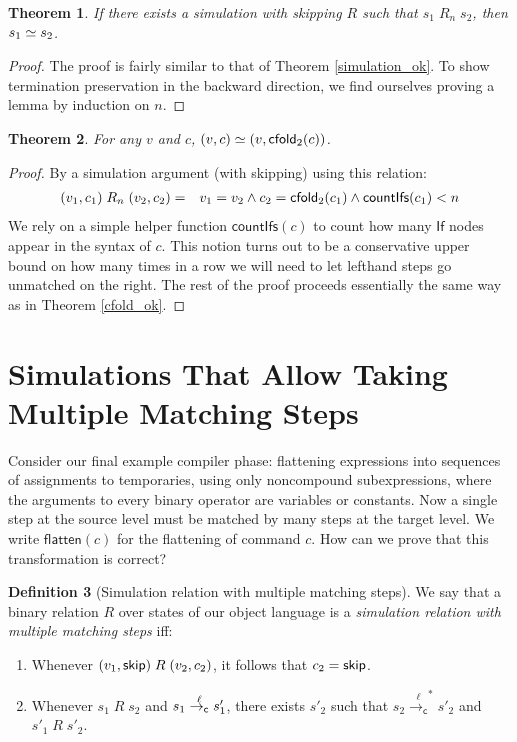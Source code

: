 \documentclass{amsbook}
\newtheorem{theorem}{Theorem}[chapter]
\theoremstyle{definition}
\newtheorem{definition}[theorem]{Definition}
\theoremstyle{remark}
\numberwithin{section}{chapter}
\numberwithin{equation}{chapter}
\begin{document}
\begin{theorem}
  If there exists a simulation with skipping $R$ such that $s_1 \; R_n \; s_2$, then $s_1 \simeq s_2$.
\end{theorem}
\begin{proof}
  The proof is fairly similar to that of Theorem \ref{simulation_ok}.
  To show termination preservation in the backward direction, we find ourselves proving a lemma by induction on $n$.
\end{proof}

\newcommand{\countIfs}[1]{\mathsf{countIfs}(#1)}

\begin{theorem}
  For any $v$ and $c$, $(v, c) \simeq (v, \mathsf{cfold}_2(c))$.
\end{theorem}
\begin{proof}
  By a simulation argument (with skipping) using this relation:
  \begin{eqnarray*}
    (v_1, c_1) \; R_n \; (v_2, c_2) &=& v_1 = v_2 \land c_2 = \cfoldt{c_1} \land \countIfs{c_1} < n
  \end{eqnarray*}
  We rely on a simple helper function $\countIfs{c}$ to count how many $\mathsf{If}$ nodes appear in the syntax of $c$.
  This notion turns out to be a conservative upper bound on how many times in a row we will need to let lefthand steps go unmatched on the right.
  The rest of the proof proceeds essentially the same way as in Theorem \ref{cfold_ok}.
\end{proof}


\section{Simulations That Allow Taking Multiple Matching Steps}

\newcommand{\flatten}[1]{\mathsf{flatten}(#1)}
\newcommand{\smallstepcls}[3]{#1 \stackrel{#2}{\to_\mathsf{c}}^* #3}

Consider our final example compiler phase: flattening expressions into sequences of assignments to temporaries, using only noncompound subexpressions, where the arguments to every binary operator are variables or constants.
Now a single step at the source level must be matched by many steps at the target level.
We write $\flatten{c}$ for the flattening of command $c$.
How can we prove that this transformation is correct?

\begin{definition}[Simulation relation with multiple matching steps]
  We say that a binary relation $R$ over states of our object language is a \emph{simulation relation with multiple matching steps} iff:
  \begin{enumerate}
    \item Whenever $(v_1, \mathsf{skip}) \; R \; (v_2, c_2)$, it follows that $c_2 = \mathsf{skip}$.
    \item Whenever $s_1 \; R \; s_2$ and $s_1 \stackrel{\ell}{\to_\mathsf{c}} s'_1$, there exists $s'_2$ such that $\smallstepcls{s_2}{\ell}{s'_2}$ and $s'_1 \; R \; s'_2$.
  \end{enumerate}
\end{definition}
\end{document}
